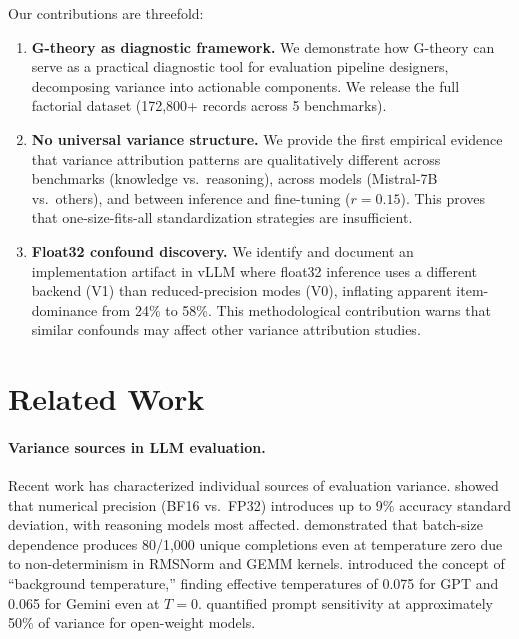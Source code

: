 \documentclass[letterpaper]{article}
\begin{document}
Our contributions are threefold:
\begin{enumerate}
    \item \textbf{G-theory as diagnostic framework.} We demonstrate how G-theory can serve as a practical diagnostic tool for evaluation pipeline designers, decomposing variance into actionable components. We release the full factorial dataset (172{,}800+ records across 5 benchmarks).
    \item \textbf{No universal variance structure.} We provide the first empirical evidence that variance attribution patterns are qualitatively different across benchmarks (knowledge vs.\ reasoning), across models (Mistral-7B vs.\ others), and between inference and fine-tuning ($r=0.15$). This proves that one-size-fits-all standardization strategies are insufficient.
    \item \textbf{Float32 confound discovery.} We identify and document an implementation artifact in vLLM where float32 inference uses a different backend (V1) than reduced-precision modes (V0), inflating apparent item-dominance from 24\% to 58\%. This methodological contribution warns that similar confounds may affect other variance attribution studies.
\end{enumerate}


\section{Related Work}

\paragraph{Variance sources in LLM evaluation.}
Recent work has characterized individual sources of evaluation variance.
\citet{yuan2025precision} showed that numerical precision (BF16 vs.\ FP32) introduces up to 9\% accuracy standard deviation, with reasoning models most affected.
\citet{thinkingmachines2025} demonstrated that batch-size dependence produces 80/1{,}000 unique completions even at temperature zero due to non-determinism in RMSNorm and GEMM kernels.
\citet{messina2026} introduced the concept of ``background temperature,'' finding effective temperatures of 0.075 for GPT and 0.065 for Gemini even at $T=0$.
\citet{brittlebench2026} quantified prompt sensitivity at approximately 50\% of variance for open-weight models.
\end{document}
